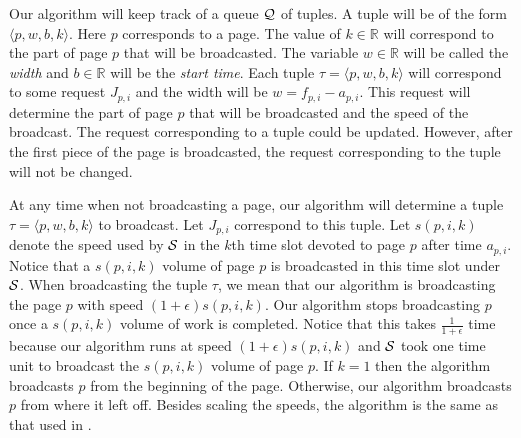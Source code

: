 \documentclass[11pt]{article}
\newcommand{\eps}{\epsilon}
\newcommand{\cS}{{\cal S}}
\newcommand{\cQ}{{\cal Q}}
\begin{document}
Our algorithm will keep track of a queue $\cQ$ of tuples.  A tuple will be of the form $\langle p, w, b, k \rangle$.   Here $p$ corresponds to a page. The value of $k \in \mathbb{R}$ will correspond to the part of page $p$ that will be broadcasted.  The variable $w \in \mathbb{R}$ will be called the \emph{width} and $b \in \mathbb{R}$ will be the \emph{start time}.     Each tuple $\tau = \langle  p, w, b, k \rangle$ will correspond to some request $J_{p,i}$ and the width will be $w= f_{p,i} - a_{p,i} $.  This request will determine the part of page $p$ that will be broadcasted and the speed of the broadcast.  The request corresponding to a tuple could be updated.  However, after the first piece of the page is broadcasted, the request corresponding to the tuple will not be changed. 

At any time when not broadcasting a page, our algorithm will determine a tuple $\tau= \langle  p, w, b, k \rangle$ to broadcast.  Let $J_{p,i}$ correspond to this tuple.  Let $s(p,i,k)$ denote the speed used by  $\cS$ in the $k$th time slot devoted to page $p$ after time $a_{p,i}$.  Notice that a $s(p,i,k)$ volume of page $p$ is broadcasted in this time slot under $\cS$.   When broadcasting the tuple $\tau$, we mean that our algorithm is broadcasting the page $p$ with speed $(1+\eps)s(p,i,k)$.  Our algorithm stops broadcasting $p$ once a $s(p,i,k)$ volume of work is completed.  Notice that this takes $\frac{1}{1+\eps}$ time because our algorithm runs at speed $(1+\eps)s(p,i,k)$ and $\cS$ took one time unit to broadcast the $s(p,i,k)$ volume of page $p$.  If $k= 1$ then the algorithm broadcasts $p$ from the beginning of the page.  Otherwise, our algorithm broadcasts $p$ from where it left off.    Besides scaling the speeds, the algorithm is the same as that used in  \cite{BansalKN09}.
\end{document}
